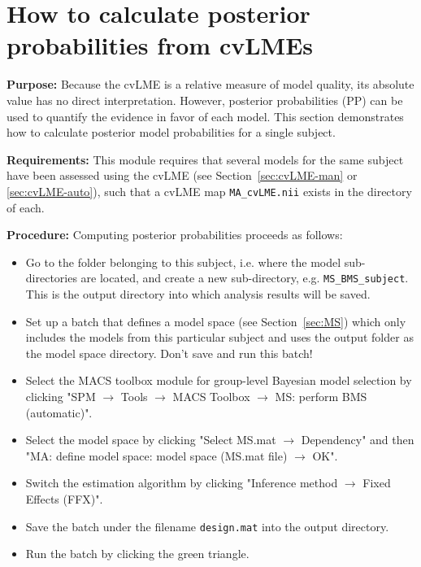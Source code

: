 \documentclass[a4paper,12pt]{article}
\newcommand{\ra}{$\rightarrow$ }
\begin{document}
\pagebreak
\section{How to calculate posterior probabilities from cvLMEs} \label{sec:PP}

\textbf{Purpose:} Because the cvLME is a relative measure of model quality, its absolute value has no direct interpretation. However, posterior probabilities (PP) can be used to quantify the evidence in favor of each model. This section demonstrates how to calculate posterior model probabilities for a single subject.

\textbf{Requirements:} This module requires that several models for the same subject have been assessed using the cvLME (see Section~\ref{sec:cvLME-man} or \ref{sec:cvLME-auto}), such that a cvLME map \texttt{MA\_cvLME.nii} exists in the directory of each.

\textbf{Procedure:} Computing posterior probabilities proceeds as follows:
\begin{itemize}

\item
Go to the folder belonging to this subject, i.e. where the model sub-directories are located, and create a new sub-directory, e.g. \texttt{MS\_BMS\_subject}. This is the output directory into which analysis results will be saved.
	
\item
Set up a batch that defines a model space (see Section~\ref{sec:MS}) which only includes the models from this particular subject and uses the output folder as the model space directory. Don't save and run this batch!

\item
Select the MACS toolbox module for group-level Bayesian model selection by clicking \linebreak[4] "SPM \ra Tools \ra MACS Toolbox \ra MS: perform BMS (automatic)".

\item
Select the model space by clicking "Select MS.mat \ra Dependency" and then \linebreak[4] "MA: define model space: model space (MS.mat file) \ra OK".

\item
Switch the estimation algorithm by clicking "Inference method \ra Fixed Effects (FFX)".

\item
Save the batch under the filename \texttt{design.mat} into the output directory.

\item
Run the batch by clicking the green triangle.
	
\end{itemize}
\end{document}
